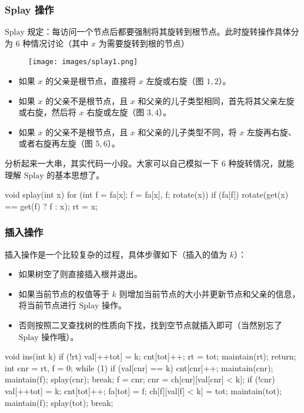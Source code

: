 \subsubsection{Splay 操作}

$\text{Splay}$ 规定：每访问一个节点后都要强制将其旋转到根节点。此时旋转操作具体分为 $6$ 种情况讨论（其中 $x$ 为需要旋转到根的节点）

\begin{figure}[h]
\centering
\texttt{[image: images/splay1.png]} 

\end{figure}

\begin{itemize}
\item 如果 $x$ 的父亲是根节点，直接将 $x$ 左旋或右旋（图 $1,2$）。
\item 如果 $x$ 的父亲不是根节点，且 $x$ 和父亲的儿子类型相同，首先将其父亲左旋或右旋，然后将 $x$ 右旋或左旋（图 $3,4$）。
\item 如果 $x$ 的父亲不是根节点，且 $x$ 和父亲的儿子类型不同，将 $x$ 左旋再右旋、或者右旋再左旋（图 $5,6$）。
\end{itemize}

分析起来一大串，其实代码一小段。大家可以自己模拟一下 $6$ 种旋转情况，就能理解 $\text{Splay}$ 的基本思想了。

\begin{cppcode}
void splay(int x) {
  for (int f = fa[x]; f = fa[x], f; rotate(x))
    if (fa[f]) rotate(get(x) == get(f) ? f : x);
  rt = x;
}
\end{cppcode}

\subsubsection{插入操作}

插入操作是一个比较复杂的过程，具体步骤如下（插入的值为 $k$）：

\begin{itemize}
\item 如果树空了则直接插入根并退出。
\item 如果当前节点的权值等于 $k$ 则增加当前节点的大小并更新节点和父亲的信息，将当前节点进行 $\text{Splay}$ 操作。
\item 否则按照二叉查找树的性质向下找，找到空节点就插入即可（当然别忘了 $\text{Splay}$ 操作哦）。
\end{itemize}

\begin{cppcode}
void ins(int k) {
  if (!rt) {
    val[++tot] = k;
    cnt[tot]++;
    rt = tot;
    maintain(rt);
    return;
  }
  int cnr = rt, f = 0;
  while (1) {
    if (val[cnr] == k) {
      cnt[cnr]++;
      maintain(cnr);
      maintain(f);
      splay(cnr);
      break;
    }
    f = cnr;
    cnr = ch[cnr][val[cnr] < k];
    if (!cnr) {
      val[++tot] = k;
      cnt[tot]++;
      fa[tot] = f;
      ch[f][val[f] < k] = tot;
      maintain(tot);
      maintain(f);
      splay(tot);
      break;
    }
  }
}
\end{cppcode}


